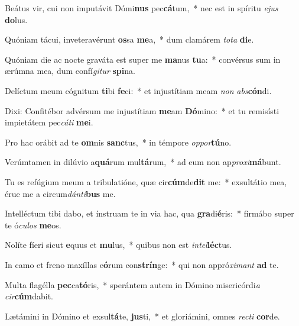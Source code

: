 \item Beátus vir, cui non imputávit Dómi\textbf{nus} pec\textbf{cá}tum,~* nec est in spíritu \textit{e}\textit{jus} \textbf{do}lus.
\item Quóniam tácui, inveteravérunt \textbf{os}sa \textbf{me}a,~* dum clamárem \textit{to}\textit{ta} \textbf{di}e.
\item Quóniam die ac nocte graváta est super me \textbf{ma}nus \textbf{tu}a:~* convérsus sum in ærúmna mea, dum confí\textit{gi}\textit{tur} \textbf{spi}na.
\item Delíctum meum cógnitum \textbf{ti}bi \textbf{fe}ci:~* et injustítiam meam \textit{non} \textit{abs}\textbf{cón}di.
\item Dixi: Confitébor advérsum me injustítiam \textbf{me}am \textbf{Dó}mino:~* et tu remisísti impietátem pec\textit{cá}\textit{ti} \textbf{me}i.
\item Pro hac orábit ad te \textbf{om}nis \textbf{sanc}tus,~* in témpore \textit{op}\textit{por}\textbf{tú}no.
\item Verúmtamen in dilúvio a\textbf{quá}rum mul\textbf{tá}rum,~* ad eum non ap\textit{pro}\textit{xi}\textbf{má}bunt.
\item Tu es refúgium meum a tribulatióne, quæ cir\textbf{cúm}de\textbf{dit} me:~* exsultátio mea, érue me a circum\textit{dán}\textit{ti}\textbf{bus} me.
\item Intelléctum tibi dabo, et ínstruam te in via hac, qua \textbf{gra}di\textbf{é}ris:~* firmábo super te ó\textit{cu}\textit{los} \textbf{me}os.
\item Nolíte fíeri sicut \textbf{e}quus et \textbf{mu}lus,~* quibus non est \textit{in}\textit{tel}\textbf{léc}tus.
\item In camo et freno maxíllas e\textbf{ó}rum con\textbf{strín}ge:~* qui non appró\textit{xi}\textit{mant} \textbf{ad} te.
\item Multa flagélla \textbf{pec}ca\textbf{tó}ris,~* sperántem autem in Dómino misericórdi\textit{a} \textit{cir}\textbf{cúm}dabit.
\item Lætámini in Dómino et exsul\textbf{tá}te, \textbf{jus}ti,~* et gloriámini, omnes \textit{rec}\textit{ti} \textbf{cor}de.
